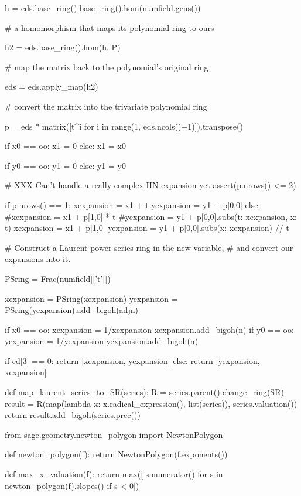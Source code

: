 \begin{sagecommonsmall}
    h = eds.base_ring().base_ring().hom(numfield.gens())

    # a homomorphism that maps its polynomial ring to ours

    h2 = eds.base_ring().hom(h, P)

    # map the matrix back to the polynomial's original ring

    eds = eds.apply_map(h2)

    # convert the matrix into the trivariate polynomial ring

    p = eds * matrix([t^i for i in range(1, eds.ncols()+1)]).transpose()

    if x0 == oo:
        x1 = 0
    else:
        x1 = x0

    if y0 == oo:
        y1 = 0
    else:
        y1 = y0

    # XXX Can't handle a really complex HN expansion yet
    assert(p.nrows() <= 2)

    if p.nrows() == 1:
        xexpansion = x1 + t
        yexpansion = y1 + p[0,0]
    else:
        #xexpansion = x1 + p[1,0] * t
        #yexpansion = y1 + p[0,0].subs({t: xexpansion, x: t})
        xexpansion = x1 + p[1,0]
        yexpansion = y1 + p[0,0].subs({x: xexpansion}) // t

    # Construct a Laurent power series ring in the new variable,
    # and convert our expansions into it.

    PSring = Frac(numfield[['t']])

    xexpansion = PSring(xexpansion)
    yexpansion = PSring(yexpansion).add_bigoh(adjn)

    if x0 == oo:
        xexpansion = 1/xexpansion
        xexpansion.add_bigoh(n)
    if y0 == oo:
        yexpansion = 1/yexpansion
        yexpansion.add_bigoh(n)

    if ed[3] == 0:
        return [xexpansion, yexpansion]
    else:
        return [yexpansion, xexpansion]

def map_laurent_series_to_SR(series):
    R = series.parent().change_ring(SR)
    result = R(map(lambda x: x.radical_expression(), list(series)), series.valuation())
    return result.add_bigoh(series.prec())

from sage.geometry.newton_polygon import NewtonPolygon

def newton_polygon(f):
    return NewtonPolygon(f.exponents())

def max_x_valuation(f):
    return max([-s.numerator() for s in newton_polygon(f).slopes() if s < 0])


\end{sagecommonsmall}
